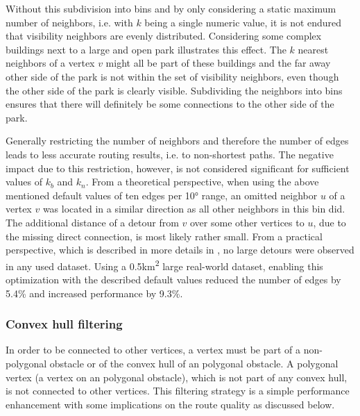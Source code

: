 			Without this subdivision into bins and by only considering a static maximum number of neighbors, i.e. with $k$ being a single numeric value, it is not endured that visibility neighbors are evenly distributed.
			Considering some complex buildings next to a large and open park illustrates this effect.
			The $k$ nearest neighbors of a vertex $v$ might all be part of these buildings and the far away other side of the park is not within the set of visibility neighbors, even though the other side of the park is clearly visible.
			Subdividing the neighbors into bins ensures that there will definitely be some connections to the other side of the park.
			
			Generally restricting the number of neighbors and therefore the number of edges leads to less accurate routing results, i.e. to non-shortest paths.
			The negative impact due to this restriction, however, is not considered significant for sufficient values of $k_b$ and $k_n$.
			From a theoretical perspective, when using the above mentioned default values of ten edges per 10° range, an omitted neighbor $u$ of a vertex $v$ was located in a similar direction as all other neighbors in this bin did.
			The additional distance of a detour from $v$ over some other vertices to $u$, due to the missing direct connection, is most likely rather small.
			From a practical perspective, which is described in more details in , no large detours were observed in any used dataset.
			Using a 0.5km\textsuperscript{2} large real-world dataset, enabling this optimization with the described default values reduced the number of edges by 5.4\% and increased performance by 9.3\%.
			
		\subsubsection{Convex hull filtering}
		\label{subsubsec:convex-hull}
			
			In order to be connected to other vertices, a vertex must be part of a non-polygonal obstacle or of the convex hull of an polygonal obstacle.
			A polygonal vertex (a vertex on an polygonal obstacle), which is not part of any convex hull, is not connected to other vertices.
			This filtering strategy is a simple performance enhancement with some implications on the route quality as discussed below.
			
